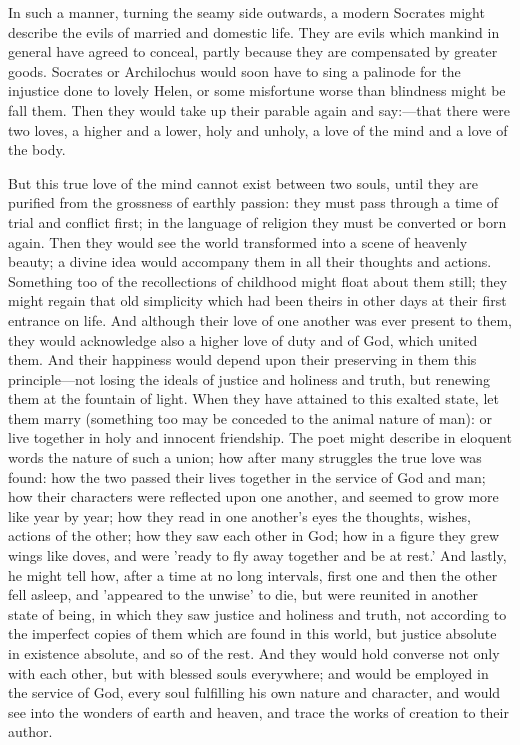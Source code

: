 \documentclass[11pt,letter]{article}
\begin{document}
\par  In such a manner, turning the seamy side outwards, a modern Socrates might describe the evils of married and domestic life. They are evils which mankind in general have agreed to conceal, partly because they are compensated by greater goods. Socrates or Archilochus would soon have to sing a palinode for the injustice done to lovely Helen, or some misfortune worse than blindness might be fall them. Then they would take up their parable again and say:—that there were two loves, a higher and a lower, holy and unholy, a love of the mind and a love of the body.
 
\par  But this true love of the mind cannot exist between two souls, until they are purified from the grossness of earthly passion: they must pass through a time of trial and conflict first; in the language of religion they must be converted or born again. Then they would see the world transformed into a scene of heavenly beauty; a divine idea would accompany them in all their thoughts and actions. Something too of the recollections of childhood might float about them still; they might regain that old simplicity which had been theirs in other days at their first entrance on life. And although their love of one another was ever present to them, they would acknowledge also a higher love of duty and of God, which united them. And their happiness would depend upon their preserving in them this principle—not losing the ideals of justice and holiness and truth, but renewing them at the fountain of light. When they have attained to this exalted state, let them marry (something too may be conceded to the animal nature of man): or live together in holy and innocent friendship. The poet might describe in eloquent words the nature of such a union; how after many struggles the true love was found: how the two passed their lives together in the service of God and man; how their characters were reflected upon one another, and seemed to grow more like year by year; how they read in one another's eyes the thoughts, wishes, actions of the other; how they saw each other in God; how in a figure they grew wings like doves, and were 'ready to fly away together and be at rest.' And lastly, he might tell how, after a time at no long intervals, first one and then the other fell asleep, and 'appeared to the unwise' to die, but were reunited in another state of being, in which they saw justice and holiness and truth, not according to the imperfect copies of them which are found in this world, but justice absolute in existence absolute, and so of the rest. And they would hold converse not only with each other, but with blessed souls everywhere; and would be employed in the service of God, every soul fulfilling his own nature and character, and would see into the wonders of earth and heaven, and trace the works of creation to their author.
\end{document}
